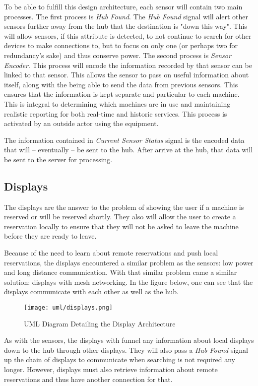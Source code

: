 \documentclass[PPFS.tex]{template/subfiles}
\newcommand{\sn}[1]{\textit{#1}}
\begin{document}
To be able to fulfill this design architecture, each sensor will contain two main processes. The first process is \sn{Hub Found}. The \sn{Hub Found} signal will alert other sensors further away from the hub that the destination is "down this way". This will allow sensors, if this attribute is detected, to not continue to search for other devices to make connections to, but to focus on only one (or perhaps two for redundancy's sake) and thus conserve power. The second process is \sn{Sensor Encoder}. This process will encode the information recorded by that sensor can be linked to that sensor. This allows the sensor to pass on useful information about itself,  along with the being able to send the data from previous sensors. This ensures that the information is kept separate and particular to each machine. This is integral to determining which machines are in use and maintaining realistic reporting for both real-time and historic services. This process is activated by an outside actor using the equipment.

The information contained in \sn{Current Sensor Status} signal is the encoded data that will -- eventually -- be sent to the hub. After arrive at the hub, that data will be sent to the server for processing.

\subsection{Displays}

The displays are the answer to the problem of showing the user if a machine is reserved or will be reserved shortly. They also will allow the user to create a reservation locally to ensure that they will not be asked to leave the machine before they are ready to leave.


Because of the need to learn about remote reservations and push local reservations, the displays encountered a similar problem as the sensors: low power and long distance communication. With that similar problem came a similar solution: displays with mesh networking. In the figure below, one can see that the displays communicate with each other as well as the hub.

\begin{figure}[H]
    \centering
    \texttt{[image: uml/displays.png]}
    \caption{UML Diagram Detailing the Display Architecture}
\end{figure}

As with the sensors, the displays with funnel any information about local displays down to the hub through other displays. They will also pass a \textit{Hub Found} signal up the chain of displays to communicate when searching is not required any longer. However, displays must also retrieve information about remote reservations and thus have another connection for that.
\end{document}
